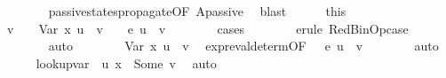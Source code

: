 \begin{isabellebody}
\ \ \ \ \ \ \isamarkupfalse%
\ passive{\isacharunderscore}{\kern0pt}states{\isacharunderscore}{\kern0pt}propagate{\isacharunderscore}{\kern0pt}{}{\isacharbrackleft}{\kern0pt}OF\ Apassive{\isacharbrackright}{\kern0pt}\ \isamarkupfalse%
\ blast\isanewline
\isanewline
\ \ \ \ \isamarkupfalse%
\ this\ \isamarkupfalse%
\ v{\isacharprime}{\kern0pt}\ \ {\isachardoublequoteopen}{\isasymLambda}{\isacharcomma}{\kern0pt}{\isasymGamma}{\isacharcomma}{\kern0pt}{\isasymOmega}\ {\isasymturnstile}\ {\isasymlangle}Var\ x{\isacharcomma}{\kern0pt}\ u{\isacharprime}{\kern0pt}{\isasymrangle}\ {\isasymDown}\ v{\isacharprime}{\kern0pt}{\isachardoublequoteclose}\ \ {\isachardoublequoteopen}{\isasymLambda}{\isacharcomma}{\kern0pt}{\isasymGamma}{\isacharcomma}{\kern0pt}{\isasymOmega}\ {\isasymturnstile}\ {\isasymlangle}e{}{\isacharcomma}{\kern0pt}\ u{\isacharprime}{\kern0pt}{\isasymrangle}\ {\isasymDown}\ v{\isacharprime}{\kern0pt}{\isachardoublequoteclose}\isanewline
\ \ \ \ \ \ \isamarkupfalse%
\ cases\isanewline
\ \ \ \ \ \ \isamarkupfalse%
\ {\isacharparenleft}{\kern0pt}erule\ RedBinOp{\isacharunderscore}{\kern0pt}case{\isacharparenright}{\kern0pt}\isanewline
\ \ \ \ \ \ \isamarkupfalse%
\ auto\isanewline
\ \ \ \ \isamarkupfalse%
\ {\isachardoublequoteopen}{\isasymLambda}{\isacharcomma}{\kern0pt}{\isasymGamma}{\isacharcomma}{\kern0pt}{\isasymOmega}\ {\isasymturnstile}\ {\isasymlangle}Var\ x{\isacharcomma}{\kern0pt}\ u{\isacharprime}{\kern0pt}{\isasymrangle}\ {\isasymDown}\ v{\isachardoublequoteclose}\ \isamarkupfalse%
\ expr{\isacharunderscore}{\kern0pt}eval{\isacharunderscore}{\kern0pt}determ{\isacharparenleft}{\kern0pt}{}{\isacharparenright}{\kern0pt}{\isacharbrackleft}{\kern0pt}OF\ {\isacartoucheopen}{\isasymLambda}{\isacharcomma}{\kern0pt}{\isasymGamma}{\isacharcomma}{\kern0pt}{\isasymOmega}\ {\isasymturnstile}\ {\isasymlangle}e{}{\isacharcomma}{\kern0pt}\ u{\isacharprime}{\kern0pt}{\isasymrangle}\ {\isasymDown}\ v{\isacartoucheclose}{\isacharbrackright}{\kern0pt}\isanewline
\ \ \ \ \ \ \isamarkupfalse%
\ auto\isanewline
\ \ \ \ \isamarkupfalse%
\ {\isachardoublequoteopen}lookup{\isacharunderscore}{\kern0pt}var\ {\isasymLambda}\ u{\isacharprime}{\kern0pt}\ x\ {\isacharequal}{\kern0pt}\ Some\ v{\isachardoublequoteclose}\ \isamarkupfalse%
\ auto\ \isanewline

\end{isabellebody}
